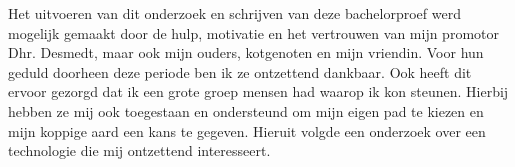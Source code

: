\bigbreak{}

Het uitvoeren van dit onderzoek en schrijven van deze bachelorproef werd mogelijk gemaakt door de hulp, motivatie en het vertrouwen van mijn promotor Dhr. Desmedt, maar ook mijn ouders, kotgenoten en mijn vriendin. Voor hun geduld doorheen deze periode ben ik ze ontzettend dankbaar. Ook heeft dit ervoor gezorgd dat ik een grote groep mensen had waarop ik kon steunen. Hierbij hebben ze mij ook toegestaan en ondersteund om mijn eigen pad te kiezen en mijn koppige aard een kans te gegeven. Hieruit volgde een onderzoek over een technologie die mij ontzettend interesseert.